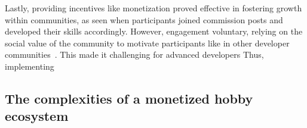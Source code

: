 Lastly, providing incentives like monetization proved effective in fostering growth within communities, as seen when participants joined  commission posts and developed their skills accordingly.  However,  engagement  voluntary, relying on the social value of the community to motivate participants like in other developer communities~\cite{lu2021motivation}. This made it challenging for advanced developers 
Thus, implementing  \\

\subsection{The complexities of a monetized hobby ecosystem}
\label{discussion:monetization}

